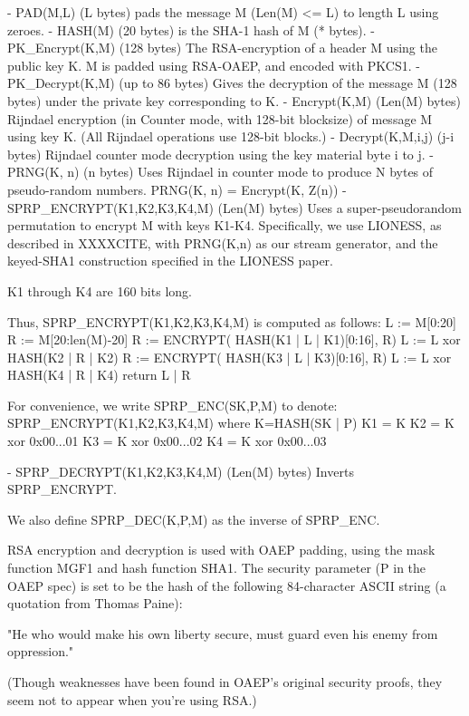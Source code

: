 - PAD(M,L) (L bytes) pads the message M (Len(M) <= L) to length L
  using zeroes.
- HASH(M) (20 bytes) is the SHA-1 hash of M (* bytes).
- PK_Encrypt(K,M) (128 bytes) The RSA-encryption of a header M 
  using the public key K.  M is padded using RSA-OAEP, and encoded
  with PKCS1.
- PK_Decrypt(K,M) (up to 86 bytes) Gives the decryption of the
  message M (128 bytes) under the private key corresponding to K.
- Encrypt(K,M) (Len(M) bytes) Rijndael encryption (in Counter mode,
  with 128-bit blocksize) of message M using key K.  (All Rijndael
  operations use 128-bit blocks.)
- Decrypt(K,M,i,j) (j-i bytes) Rijndael counter mode decryption 
  using the key material byte i to j.
- PRNG(K, n) (n bytes) Uses Rijndael in counter mode to produce N
  bytes of pseudo-random numbers.
  PRNG(K, n) = Encrypt(K, Z(n))
- SPRP_ENCRYPT(K1,K2,K3,K4,M) (Len(M) bytes) Uses a super-pseudorandom
  permutation to encrypt M with keys K1-K4.  Specifically, we use LIONESS,
  as described in XXXXCITE, with PRNG(K,n) as our stream generator,
  and the keyed-SHA1 construction specified in the LIONESS paper.

  K1 through K4 are 160 bits long.

  Thus, SPRP_ENCRYPT(K1,K2,K3,K4,M) is computed as follows:
            L := M[0:20]
            R := M[20:len(M)-20]
            R := ENCRYPT( HASH(K1 | L | K1)[0:16], R)
            L := L xor HASH(K2 | R | K2)
            R := ENCRYPT( HASH(K3 | L | K3)[0:16], R)
            L := L xor HASH(K4 | R | K4) 
            return L | R

  For convenience, we write SPRP_ENC(SK,P,M) to denote:
       SPRP_ENCRYPT(K1,K2,K3,K4,M)
       where K=HASH(SK | P)
             K1 = K
             K2 = K xor 0x00...01
             K3 = K xor 0x00...02
             K4 = K xor 0x00...03

- SPRP_DECRYPT(K1,K2,K3,K4,M) (Len(M) bytes) Inverts SPRP_ENCRYPT.

  We also define SPRP_DEC(K,P,M) as the inverse of SPRP_ENC.

RSA encryption and decryption is used with OAEP padding, using the
mask function MGF1 and hash function SHA1.  The security parameter (P
in the OAEP spec) is set to be the hash of the following 84-character
ASCII string (a quotation from Thomas Paine):

     "He who would make his own liberty secure, must guard even his
      enemy from oppression." 

(Though weaknesses have been found in OAEP's original security proofs,
they seem not to appear when you're using RSA.)

